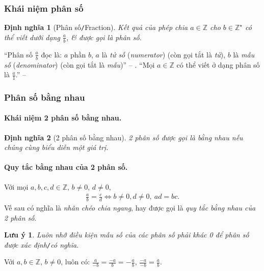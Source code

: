 \documentclass{article}
\numberwithin{equation}{section}
\newtheorem{definition}{Định nghĩa}[section]
\newtheorem{remark}{Lưu ý}[section]
\begin{document}
\subsubsection{Khái niệm phân số}

\begin{definition}[Phân số\texttt{/}Fraction]
	Kết quả của phép chia $a\in\mathbb{Z}$ cho $b\in\mathbb{Z}^\star$ có thể viết dưới dạng $\frac{a}{b}$, \textit{\&} được gọi là \emph{phân số}.
\end{definition}
``Phân số $\frac{a}{b}$ đọc là: $a$ phần $b$, $a$ là \textit{tử số} (\textit{numerator}) (còn gọi tắt là \textit{tử}), $b$ là \textit{mẫu số} (\textit{denominator}) (còn gọi tắt là \textit{mẫu})'' -- \cite[p.  25]{Thai_Anh_Dat_Ha_Loan_Nam_Quang_Toan_6_tap_2}. ``Mọi $a\in\mathbb{Z}$ có thể viết ở dạng phân số là $\frac{a}{1}$.'' -- \cite[p.  26]{Thai_Anh_Dat_Ha_Loan_Nam_Quang_Toan_6_tap_2}

\subsubsection{Phân số bằng nhau}

\paragraph{Khái niệm 2 phân số bằng nhau.}
\begin{definition}[2 phân số bằng nhau]
	2 phân số được gọi là \emph{bằng nhau} nếu chúng cùng biểu diễn một giá trị.
\end{definition}

\paragraph{Quy tắc bằng nhau của 2 phân số.} Với mọi $a,b,c,d\in\mathbb{Z}$, $b\ne 0$, $d\ne 0$,
\begin{align*}
	\boxed{\frac{a}{b} = \frac{c}{d}\Leftrightarrow b\ne 0, d\ne 0,\ ad = bc.}
\end{align*}
Vế sau có nghĩa là \textit{nhân chéo chia ngang}, hay được gọi là \textit{quy tắc bằng nhau của 2 phân số}.

\begin{remark}
	Luôn nhớ điều kiện mẫu số của các phân số phải khác 0 để phân số được xác định\emph{\texttt{/}}có nghĩa.
\end{remark}
Với $a,b\in\mathbb{Z}$, $b\ne 0$, luôn có: $\frac{a}{-b} = \frac{-a}{b} = -\frac{a}{b}$, $\frac{-a}{-b} = \frac{a}{b}$.
\end{document}

